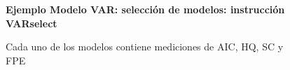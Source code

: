 	\begin{figure}[H]
		\centering
		\textbf{Ejemplo Modelo VAR: selección de modelos: instrucci\'on VARselect}\par\medskip
		\caption{Cada uno de los modelos contiene mediciones de AIC, HQ, SC y FPE}\label{fig34}
	\end{figure}
	


	
